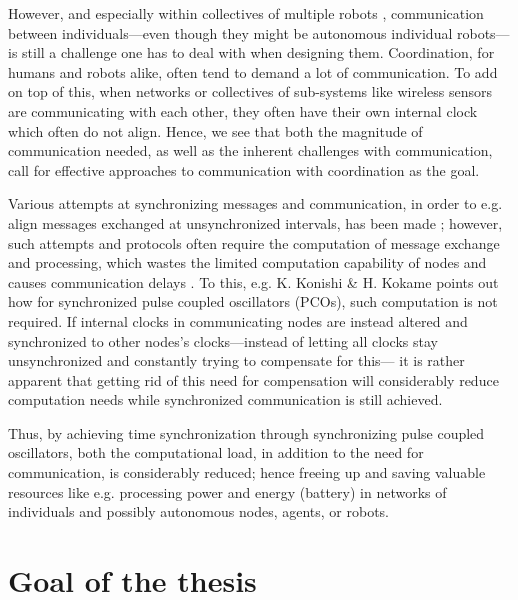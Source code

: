 However, and especially within collectives of multiple robots \cite{cocoro, swarm_bot}, communication between individuals—even though they might be autonomous individual robots—is still a challenge one has to deal with when designing them. Coordination, for humans and robots alike, often tend to demand a lot of communication. To add on top of this, when networks or collectives of sub-systems like wireless sensors are communicating with each other, they often have their own internal clock which often do not align. Hence, we see that both the magnitude of communication needed, as well as the inherent challenges with communication, call for effective approaches to communication with coordination as the goal.

Various attempts at synchronizing messages and communication, in order to e.g. align messages exchanged at unsynchronized intervals, has been made \cite{tungvinte_sync_protocols}; however, such attempts and protocols often require the computation of message exchange and processing, which wastes the limited computation capability of nodes and causes communication delays \cite{konishi_kokame}. To this, e.g. K. Konishi \& H. Kokame \cite{konishi_kokame} points out how for synchronized pulse coupled oscillators (PCOs), such computation is not required. If internal clocks in communicating nodes are instead altered and synchronized to other nodes's clocks—instead of letting all clocks stay unsynchronized and constantly trying to compensate for this— it is rather apparent that getting rid of this need for compensation will considerably reduce computation needs while synchronized communication is still achieved.

Thus, by achieving time synchronization \cite{tungvinte_sync_protocols} through synchronizing pulse coupled oscillators, both the computational load, in addition to the need for communication, is considerably reduced; hence freeing up and saving valuable resources like e.g. processing power and energy (battery) in networks of individuals and possibly autonomous nodes, agents, or robots.







\section{Goal of the thesis} %


